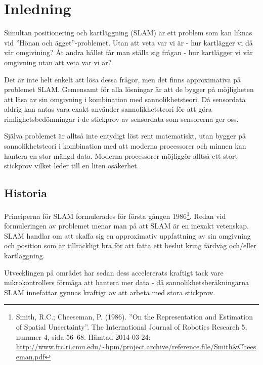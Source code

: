 \documentclass[a4paper,12pt,fleqn]{article}
\begin{document}
\addto\captionsswedish{\renewcommand{\contentsname}{Innehållsförteckning}}

\tableofcontents
\thispagestyle{fancy}
\newpage

\section{Inledning}

Simultan positionering och kartläggning (SLAM) är ett problem som kan liknas vid ''Hönan och ägget''-problemet. Utan att veta var vi är - hur kartlägger vi då vår omgivining? Åt andra hållet får man ställa sig frågan - hur kartlägger vi vår omgivning utan att veta var vi är? 

Det är inte helt enkelt att lösa dessa frågor, men det finns
approximativa på problemet SLAM. Gemensamt för alla lösningar är att de
bygger på möjligheten att läsa av sin omgivning i kombination med
sannolikhetsteori. Då sensordata aldrig kan antas vara exakt använder
sannolikhetsteori för att göra rimlighetsbedömningar i de stickprov av
sensordata som sensorerna ger oss.

Själva problemet är alltså inte entydigt löst rent matematiskt, utan
bygger på sannolikhetsteori i kombination med att moderna processorer
och minnen kan hantera en stor mängd data. Moderna processorer möjliggör
alltså ett stort stickprov vilket leder till en liten osäkerhet.

\subsection{Historia}

Principerna för SLAM formulerades för första gången 1986\footnote{Smith, R.C.; Cheeseman, P. (1986). ''On the Representation and Estimation of Spatial Uncertainty''. The International Journal of Robotics Research 5, nummer 4, sida 56–68. Hämtad 2014-03-24: \url{http://www.frc.ri.cmu.edu/~hpm/project.archive/reference.file/Smith&Cheeseman.pdf}}. Redan vid formuleringen av problemet menar man på att SLAM är en inexakt vetenskap. SLAM handlar om att skaffa sig en approximativ uppfattning av sin omgivning och position som är tillräckligt bra för att fatta ett beslut kring färdväg och/eller kartläggning. 

Utvecklingen på området har sedan dess accelererats kraftigt tack vare
mikrokontrollers förmåga att hantera mer data - då
sannolikhetsberäkningarna SLAM innefattar gynnas kraftigt av att arbeta
med stora stickprov.
\end{document}
